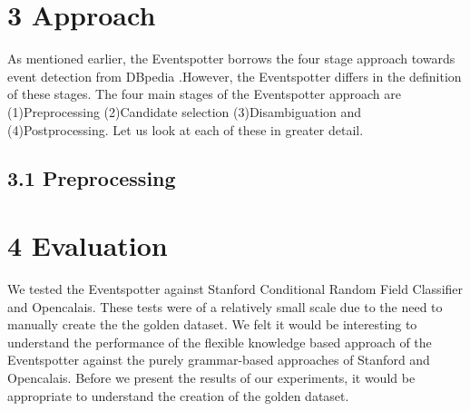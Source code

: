 \documentclass[a4paper,11pt]{report}
\begin{document}
 
\chapter*{3 Approach}
As mentioned earlier, the Eventspotter borrows the four stage approach towards event detection from DBpedia \cite{Mendes11dbpediaspotlight:} .However, the Eventspotter differs in the definition of these stages. The four main stages of the Eventspotter approach are (1)Preprocessing (2)Candidate selection (3)Disambiguation and (4)Postprocessing.
Let us look at each of these in greater detail.
\section*{3.1 Preprocessing}

\chapter*{4 Evaluation}
We tested the Eventspotter against Stanford Conditional Random Field Classifier and Opencalais. These tests were of a relatively small scale due to the need to manually create the the golden dataset. We felt it would be interesting to understand the performance of the flexible knowledge based approach of the Eventspotter against the purely grammar-based approaches of Stanford and Opencalais. Before we present the results of our experiments, it would be appropriate to understand the creation of the golden dataset. 
\end{document}
